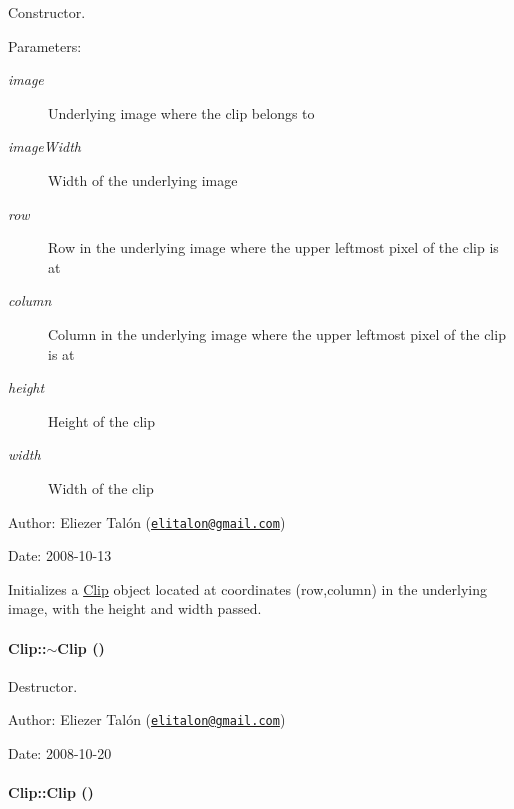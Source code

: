Constructor. 

\begin{Desc}
\item[Parameters:]
\begin{description}
\item[{\em image}]Underlying image where the clip belongs to \item[{\em imageWidth}]Width of the underlying image \item[{\em row}]Row in the underlying image where the upper leftmost pixel of the clip is at \item[{\em column}]Column in the underlying image where the upper leftmost pixel of the clip is at \item[{\em height}]Height of the clip \item[{\em width}]Width of the clip\end{description}
\end{Desc}
\begin{Desc}
\item[Author:]Eliezer Talón (\href{mailto:elitalon@gmail.com}{\tt elitalon@gmail.com}) \end{Desc}
\begin{Desc}
\item[Date:]2008-10-13\end{Desc}
Initializes a \hyperlink{class_clip}{Clip} object located at coordinates (row,column) in the underlying image, with the height and width passed. \hypertarget{class_clip_88647ed65e3482b5e0533ec98667b0fa}{
\paragraph[{$\sim$Clip}]{\setlength{\rightskip}{0pt plus 5cm}Clip::$\sim$Clip ()}\hfill}
\label{class_clip_88647ed65e3482b5e0533ec98667b0fa}


Destructor. 

\begin{Desc}
\item[Author:]Eliezer Talón (\href{mailto:elitalon@gmail.com}{\tt elitalon@gmail.com}) \end{Desc}
\begin{Desc}
\item[Date:]2008-10-20 \end{Desc}
\hypertarget{class_clip_313d69fd73a96253cb578d09d20dcbac}{
\paragraph[{Clip}]{\setlength{\rightskip}{0pt plus 5cm}Clip::Clip ()}\hfill}
\label{class_clip_313d69fd73a96253cb578d09d20dcbac}


